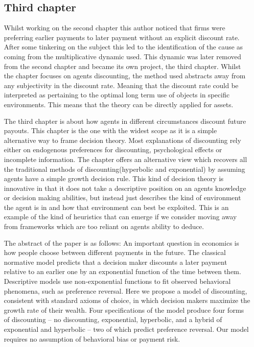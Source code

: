  \subsection{Third chapter}

Whilst working on the second chapter this author noticed that firms were preferring earlier payments to later payment without an explicit discount rate. After some tinkering on the subject this led to the identification of the cause as coming from the multiplicative dynamic used. This dynamic was later removed from the second chapter and became its own project, the third chapter. Whilst the chapter focuses on agents discounting, the method used abstracts away from any subjectivity in the discount rate. Meaning that the discount rate could be interpreted as pertaining to the optimal long term use of objects in specific environments. This means that the theory can be directly applied for assets.  

The third chapter is about how agents in different circumstances discount future payouts. This chapter is the one with the widest scope as it is a simple alternative way to frame decision theory. Most explanations of discounting rely either on endogenous preferences for discounting, psychological effects or incomplete information. The chapter offers an alternative view which recovers all the traditional methods of discounting(hyperbolic and exponential) by assuming agents have a simple growth decision rule. This kind of decision theory is innovative in that it does not take a descriptive position on an agents knowledge or decision making abilities, but instead just describes the kind of environment the agent is in and how that environment can best be exploited. This is an example of the kind of heuristics that can emerge if we consider moving away from frameworks which are too reliant on agents ability to deduce.

The abstract of the paper is as follows: An important question in economics is how people choose between different payments in the future. The classical normative model predicts that a decision maker discounts a later payment relative to an earlier one by an exponential function of the time between them. Descriptive models use non-exponential functions to fit observed behavioral phenomena, such as preference reversal. Here we propose a model of discounting, consistent with standard axioms of choice, in which decision makers maximize the growth rate of their wealth. Four specifications of the model produce four forms of discounting -- no discounting, exponential, hyperbolic, and a hybrid of exponential and hyperbolic -- two of which predict preference reversal. Our model requires no assumption of behavioral bias or payment risk.


